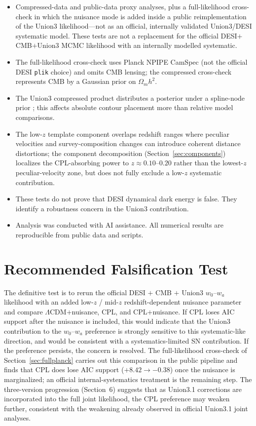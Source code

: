 \documentclass[11pt]{article}
\begin{document}
\begin{itemize}
\item Compressed-data and public-data proxy analyses, plus a full-likelihood
cross-check in which the nuisance mode is added inside a public reimplementation of the
Union3 likelihood---not as an official, internally validated Union3/DESI systematic
model. These tests are not a replacement for the official DESI$+$CMB$+$Union3 MCMC
likelihood with an internally modelled systematic.
\item The full-likelihood cross-check uses Planck NPIPE CamSpec (not the official DESI
\texttt{plik} choice) and omits CMB lensing; the compressed cross-check represents CMB
by a Gaussian prior on $\Omega_m h^2$.
\item The Union3 compressed product distributes a posterior under a spline-node prior
\cite{kim2024}; this affects absolute contour placement more than relative model
comparisons.
\item The low-$z$ template component overlaps redshift ranges where peculiar velocities
and survey-composition changes can introduce coherent distance distortions; the
component decomposition (Section~\ref{sec:components}) localizes the CPL-absorbing power
to $z\approx0.10$--$0.20$ rather than the lowest-$z$ peculiar-velocity zone, but does not
fully exclude a low-$z$ systematic contribution.
\item These tests do not prove that DESI dynamical dark energy is false. They identify a
robustness concern in the Union3 contribution.
\item Analysis was conducted with AI assistance. All numerical results are reproducible
from public data and scripts.
\end{itemize}

\section{Recommended Falsification Test}

The definitive test is to rerun the official DESI $+$ CMB $+$ Union3 $w_0$--$w_a$
likelihood with an added low-$z$ / mid-$z$ redshift-dependent nuisance parameter and
compare $\Lambda$CDM$+$nuisance, CPL, and CPL$+$nuisance. If CPL loses AIC support after the nuisance is included, this would indicate that the Union3 contribution to the $w_0$--$w_a$ preference is strongly sensitive to this systematic-like direction, and would be consistent with a systematics-limited SN contribution. If the preference persists, the concern is resolved. The
full-likelihood cross-check of Section~\ref{sec:fullplanck} carries out this comparison
in the public pipeline and finds that CPL does lose AIC support
($+8.42\to-0.38$) once the nuisance is marginalized; an official internal-systematics
treatment is the remaining step. The three-version progression (Section~6) suggests
that as Union3.1 corrections are incorporated into the full joint likelihood, the CPL
preference may weaken further, consistent with the weakening already observed in
official Union3.1 joint analyses.
\end{document}
